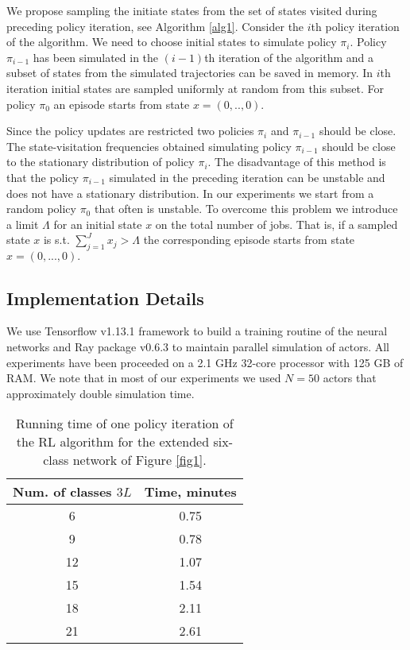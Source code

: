 \documentclass[11pt]{article}
\theoremstyle{definition}
\numberwithin{equation}{section}
\begin{document}
 We propose sampling the initiate states from the set of states visited during preceding policy iteration, see Algorithm \ref{alg1}.
  Consider the $i$th policy iteration of the algorithm. We need to choose initial states to simulate policy $\pi_i$.  Policy $\pi_{i-1}$ has been simulated in the $(i-1)$th iteration of the algorithm and a subset of states from the simulated trajectories can be saved in memory. In $i$th iteration initial states are sampled uniformly at random from this subset. For policy $\pi_0$ an episode starts from state $x = (0,..,0).$

  Since the policy updates are restricted  two policies $\pi_i$ and $\pi_{i-1}$ should be close.  The state-visitation frequencies  obtained simulating policy $\pi_{i-1}$  should be close to the stationary distribution of policy $\pi_i.$ The disadvantage of this method is that the policy $\pi_{i-1}$ simulated in the preceding iteration can be unstable and does not have a stationary distribution. In our experiments we start from a random policy $\pi_0$ that often is unstable.  To overcome this problem we introduce a limit $\Lambda$ for an initial state $x$ on the total number of  jobs. That is, if a sampled state $x$ is s.t. $\sum\limits_{j=1}^J x_j >\Lambda$ the corresponding episode starts from state $x = (0,...,0).$









   \subsection{Implementation Details}\label{sec:id}
   
   We use Tensorflow v1.13.1 framework \cite{Abadi2016} to build a training routine of the neural networks and Ray package v0.6.3 \cite{Moritz2018} to maintain parallel simulation of actors. All experiments have been proceeded on a   2.1 GHz  32-core processor with 125 GB of RAM. We note that in most of our experiments we used $N=50$ actors that approximately double simulation time.
   
   
   \begin{table}[H]
\centering%
\begin{tabular}{|c|c|}
  \hline
  Num. of classes $3L$  & Time, minutes  \\\hline
  6 & 0.75 \\\hline
  9 & 0.78 \\\hline
  12  & 1.07\\\hline
  15  & 1.54 \\\hline
  18  & 2.11\\\hline
  21  & 2.61 \\
  \hline
\end{tabular}
\caption[]{Running time of one policy iteration of the RL algorithm for the extended six-class network of Figure \ref{fig1}.}\label{tab:rt}
\end{table}





\end{document}
